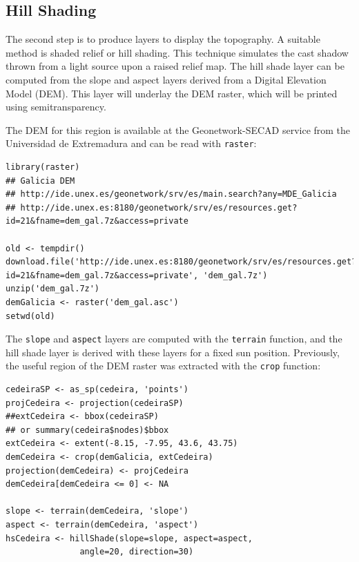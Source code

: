 \subsection{Hill Shading}
\label{sec-1-2}

The second step is to produce layers to display the topography. A
suitable method is shaded relief or hill shading. This technique
simulates the cast shadow thrown from a light source upon a raised
relief map. The hill shade layer can be computed from the slope and
aspect layers derived from a Digital Elevation Model (DEM). This layer
will underlay the DEM raster, which will be printed using
semitransparency.

The DEM for this region is available at the Geonetwork-SECAD service
from the Universidad de Extremadura and can be read with \texttt{raster}:


\lstset{language=R,numbers=none}
\begin{lstlisting}
library(raster)
## Galicia DEM
## http://ide.unex.es/geonetwork/srv/es/main.search?any=MDE_Galicia
## http://ide.unex.es:8180/geonetwork/srv/es/resources.get?id=21&fname=dem_gal.7z&access=private

old <- tempdir()
download.file('http://ide.unex.es:8180/geonetwork/srv/es/resources.get?id=21&fname=dem_gal.7z&access=private', 'dem_gal.7z')
unzip('dem_gal.7z')
demGalicia <- raster('dem_gal.asc')
setwd(old)
\end{lstlisting}

The \texttt{slope} and \texttt{aspect} layers are computed with the \texttt{terrain}
function, and the hill shade layer is derived with these layers for a
fixed sun position. Previously, the useful region of the DEM raster
was extracted with the \texttt{crop} function:


\lstset{language=R,numbers=none}
\begin{lstlisting}
cedeiraSP <- as_sp(cedeira, 'points')
projCedeira <- projection(cedeiraSP)
##extCedeira <- bbox(cedeiraSP) 
## or summary(cedeira$nodes)$bbox
extCedeira <- extent(-8.15, -7.95, 43.6, 43.75)
demCedeira <- crop(demGalicia, extCedeira)
projection(demCedeira) <- projCedeira
demCedeira[demCedeira <= 0] <- NA

slope <- terrain(demCedeira, 'slope')
aspect <- terrain(demCedeira, 'aspect')
hsCedeira <- hillShade(slope=slope, aspect=aspect,
		       angle=20, direction=30)
\end{lstlisting}
